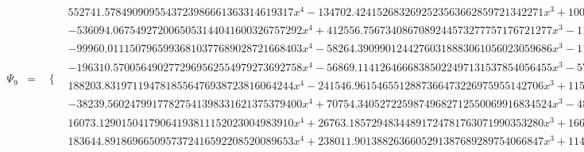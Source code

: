 \documentclass{article}
\begin{document}
\begin{landscape}
\begin{eqnarray*}
\begin{array}{cc}
\end{array}\\
\Psi_9 & = & \begin{array}{cc}
 \{ & 
\begin{array}{cc}
 552741.5784909095543723986661363314619317 x^4-134702.4241526832692523563662859721342271 x^3+10032.42298016258367666920423353146722723 x^2-215.7750996642729725061816520599303181951 x-0.8644534069344353766688379521604709955251 & x\geq 0\land x<\frac{1}{8} \\
 -536094.0675492720065053144041600326757292 x^4+412556.7567340867089244573277757176721277 x^3-116551.5191457690295532680532970028102365 x^2+14283.96481244020605229712418312227420034 x-638.4944192252567689997412470967525776814 & x\geq \frac{1}{8}\land x<\frac{1}{4} \\
 -99960.01115079659936810377689028721668403 x^4-58264.39099012442760318883061056023059686 x^3-11120.69154787974963754297933010097664045 x^2-737.0432214994010092421407296581266945402 x-8.558050289128801700813761799028478716067 & x\geq -\frac{1}{4}\land x<-\frac{1}{8} \\
 -196310.5700564902772969562554979273692758 x^4-56869.11412646668385022497131537854056455 x^3-5763.049682800483101641779445372869485518 x^2-215.7750996642729725061816520599303181951 x-0.8644534069344353766688379521604709955251 & x\geq -\frac{1}{8}\land x<0 \\
 188203.8319711947818556476938723816064244 x^4-241546.9615465512887366473226975955142706 x^3+115454.9185823156305083093985862457140393 x^2-24343.42559401167368959461092178165812250 x+1909.032752515567234044353754632597983599 & x\geq \frac{1}{4}\land x<\frac{3}{8} \\
 -38239.56024799177827541398331621375379400 x^4+70754.34052722598749682712550069916834524 x^3-48775.28773119634228417651759889418808074 x^2+14842.52037498218252141861591538703303507 x-1681.831663981856376175107587605183575044 & x\geq \frac{3}{8}\land x<\frac{1}{2} \\
 16073.12901504179064193811152023004983910 x^4+26763.18572948344891724781763071990353280 x^3+16615.92313090020514725950931893525063952 x^2+4559.685974494056700391721490821834073854 x+466.5682900115013843113440120196173266534 & x\geq -\frac{1}{2}\land x<-\frac{3}{8} \\
 183644.8918696650957372416592208520089653 x^4+238011.9013882636605291387689289754066847 x^3+114689.7749414138349763233090516273241331 x^2+24341.69164097848071696366830448929330504 x+1919.456925738127972046358605875914455163 & x\geq -\frac{3}{8}\land x<-\frac{1}{4} \\

\end{array}
\end{array}
\end{eqnarray*}
\end{landscape}
\end{document}
